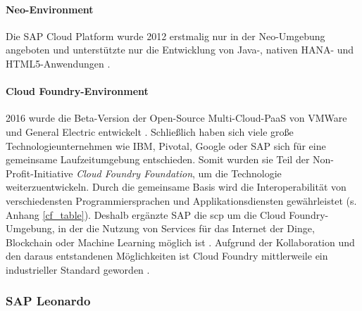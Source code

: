 \paragraph{Neo-Environment} Die SAP Cloud Platform wurde 2012 erstmalig nur in der Neo-Umgebung angeboten und unterstützte nur die Entwicklung von Java-, nativen HANA- und HTML5-Anwendungen \citep{Elsner2018}.

\paragraph{Cloud Foundry-Environment} 2016 wurde die Beta-Version der Open-Source Multi-Cloud-PaaS von VMWare und General Electric entwickelt \citep{Utecht2018}. Schließlich haben sich viele große Technologieunternehmen wie IBM, Pivotal, Google oder SAP sich für eine gemeinsame Laufzeitumgebung entschieden. Somit wurden sie Teil der Non-Profit-Initiative \textit{Cloud Foundry Foundation}, um die Technologie weiterzuentwickeln. Durch die gemeinsame Basis wird die Interoperabilität von verschiedensten Programmiersprachen und Applikationsdiensten gewährleistet (s. Anhang \ref{cf_table}).  Deshalb ergänzte SAP die \ac{scp} um die Cloud Foundry-Umgebung, in der die Nutzung von Services für das Internet der Dinge, Blockchain oder Machine Learning möglich ist \citep{Elsner2018}. Aufgrund der Kollaboration und den daraus entstandenen Möglichkeiten ist Cloud Foundry mittlerweile ein industrieller Standard geworden \citep{Acharya2019}.

\subsubsection{SAP Leonardo} \label{leo}

